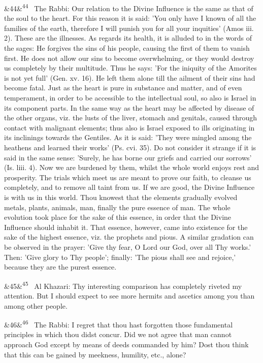 \documentclass[12pt]{article}
\newcommand{\para}[1][]{\par\noindent\ifx&#1&\else\textsuperscript{\footnotesize #1}~\fi}
\begin{document}
\para[44] The Rabbi: Our relation to the Divine Influence is the same as that of the soul to the heart. For this reason it is said: 'You only have I known of all the families of the earth, therefore I will punish you for all your inquities' (Amos iii. 2). These are the illnesses. As regards its health, it is alluded to in the words of the sages: He forgives the sins of his people, causing the first of them to vanish first. He does not allow our sins to become overwhelming, or they would destroy us completely by their multitude. Thus he says: 'For the iniquity of the Amorites is not yet full' (Gen. xv. 16). He left them alone till the ailment of their sins had become fatal. Just as the heart is pure in substance and matter, and of even temperament, in order to be accessible to the intellectual soul, so also is Israel in its component parts. In the same way as the heart may be affected by disease of the other organs, viz. the lusts of the liver, stomach and genitals, caused through contact with malignant elements; thus also is Israel exposed to ills originating in its inclinings towards the Gentiles. As it is said: 'They were mingled among the heathens and learned their works' (Ps. cvi. 35). Do not consider it strange if it is said in the same sense: 'Surely, he has borne our griefs and carried our sorrows' (Is. liii. 4). Now we are burdened by them, whilst the whole world enjoys rest and prosperity. The trials which meet us are meant to prove our faith, to cleanse us completely, and to remove all taint from us. If we are good, the Divine Influence is with us in this world. Thou knowest that the elements gradually evolved metals, plants, animals, man, finally the pure essence of man. The whole evolution took place for the sake of this essence, in order that the Divine Influence should inhabit it. That essence, however, came into existence for the sake of the highest essence, viz. the prophets and pious. A similar gradation can be observed in the prayer: 'Give thy fear, O Lord our God, over all Thy works.' Then: 'Give glory to Thy people'; finally: 'The pious shall see and rejoice,' because they are the purest essence.

\para[45] Al Khazari: Thy interesting comparison has completely riveted my attention. But I should expect to see more hermits and ascetics among you than among other people.

\para[46] The Rabbi: I regret that thou hast forgotten those fundamental principles in which thou didst concur. Did we not agree that man cannot approach God except by means of deeds commanded by him? Dost thou think that this can be gained by meekness, humility, etc., alone?
\end{document}

